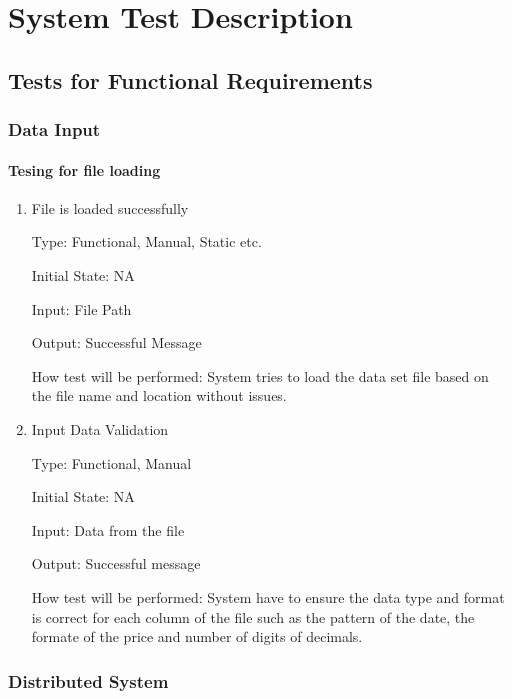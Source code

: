 \documentclass[12pt, titlepage]{article}
\begin{document}
\section{System Test Description}
	
\subsection{Tests for Functional Requirements}

\subsubsection{Data Input}
		
\paragraph{Tesing for file loading}

\begin{enumerate}

\item{File is loaded successfully\\}

Type: Functional,  Manual, Static etc.
					
Initial State: NA
					
Input: File Path
					
Output: Successful Message
					
How test will be performed: System tries to load the data set file based on the file name and location without issues.
					
\item{Input Data Validation\\}

Type: Functional, Manual
					
Initial State: NA
					
Input:  Data from the file
					
Output: Successful message
					
How test will be performed: System have to ensure the data type and format is correct for each column of the file such as the pattern of the date, the formate of the price and number of digits of decimals. 

\end{enumerate}

\subsubsection{Distributed System}
\end{document}
